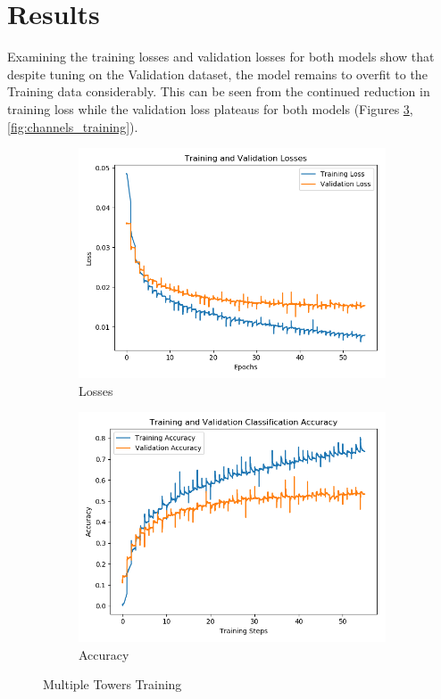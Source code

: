 \section{Results}
Examining the training losses and validation losses for both models show that despite tuning on the Validation dataset, the model remains to overfit to the Training data considerably.
This can be seen from the continued reduction in training loss while the validation loss plateaus for both models (Figures \ref{fig:multiple_towers_training}, \ref{fig:channels_training}).

\begin{figure}[h!]
    \centering
    \begin{subfigure}[b]{0.49\textwidth}
        \includegraphics[width=\textwidth]{figures/classification/blendshape_multi_tower_loss.png}
        \caption{Losses}\label{fig:blendshape_multi_tower_loss}
    \end{subfigure}
    \begin{subfigure}[b]{0.49\textwidth}
        \includegraphics[width=\textwidth]{figures/classification/blendshape_multi_tower_acc.png}
        \caption{Accuracy}\label{fig:blendshape_multi_tower_acc}
    \end{subfigure}
    \caption{Multiple Towers Training}\label{fig:multiple_towers_training}
\end{figure}

